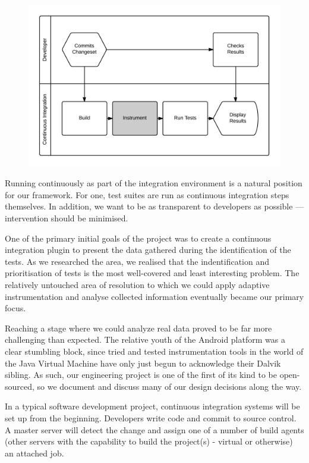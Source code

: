 \begin{figure}[h]

\includegraphics[width=\linewidth]{Images/developer_workflow}

\caption{}
\label{fig:developer_workflow}
\end{figure}

Running continuously as part of the integration environment is a natural
position for our framework. For one, test suites are run as continuous
integration steps themselves. In addition, we want to be as transparent to
developers as possible --- intervention should be minimised.

One of the primary initial goals of the project was to create a continuous
integration plugin to present the data gathered during the identification of the
\flaky tests. As we researched the area, we realised that the indentification
and prioritisation of \flaky tests is the most well-covered and least
interesting problem. The relatively untouched area of resolution to which we
could apply adaptive instrumentation and analyse collected information
eventually became our primary focus.

Reaching a stage where we could analyze real data proved to be far more
challenging than expected. The relative youth of the Android platform was a
clear stumbling block, since tried and tested instrumentation tools in the world
of the Java Virtual Machine have only just begun to acknowledge their Dalvik
sibling. As such, our engineering project is one of the first of its kind to be
open-sourced, so we document and discuss many of our design decisions along the
way.

In a typical software development project, continuous integration systems will
be set up from the beginning. Developers write code and commit to source
control. A master server will detect the change and assign one of a number of
build agents (other servers with the capability to build the project(s) -
virtual or otherwise) an attached job.

